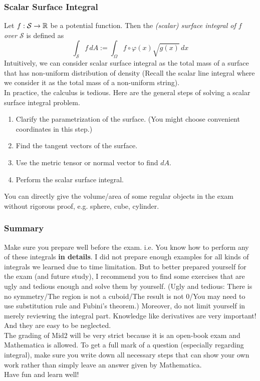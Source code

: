 \documentclass[10pt, t]{beamer}
\renewcommand{\emph}[1]{{\color{Turquoise3}\textsl{#1}}}
\newcommand{\nullspace}{~\\[15pt]}
\begin{document}
\begin{frame}
    \frametitle{Scalar Surface Integral}
    Let $f:\mathcal{S}\to\mathbb{R}$ be a potential function. Then the \emph{(scalar) surface integral of $f$ over $\mathcal{S}$} is defined as
    \[\int_\mathcal{S}f\,dA:=\int_\Omega f\circ\varphi(x)\sqrt{g(x)}\,dx\]
    Intuitively, we can consider scalar surface integral as the total mass of a surface that has non-uniform distribution of density (Recall the scalar line integral where we consider it as the total mass of a non-uniform string).
    \nullspace
    In practice, the calculus is tedious. Here are the general steps of solving a scalar surface integral problem.
    \begin{enumerate}
        \item Clarify the parametrization of the surface. (You might choose convenient coordinates in this step.)
        \item Find the tangent vectors of the surface.
        \item Use the metric tensor or normal vector to find $dA$.
        \item Perform the scalar surface integral.
    \end{enumerate}
    You can directly give the volume/area of some regular objects in the exam without rigorous proof, e.g. sphere, cube, cylinder.

\end{frame}

\begin{frame}
    \frametitle{Summary}
    Make sure you prepare well before the exam. i.e. You know how to perform any of these integrals \textbf{in details}. I did not prepare enough examples for all kinds of integrals we learned due to time limitation. But to better prepared yourself for the exam (and future study), I recommend you to find some exercises that are ugly and tedious enough and solve them by yourself. (Ugly and tedious: There is no symmetry/The region is not a cuboid/The result is not 0/You may need to use substitution rule and Fubini's theorem.) Moreover, do not limit yourself in merely reviewing the integral part. Knowledge like derivatives are very important! And they are easy to be neglected.
    \nullspace
    The grading of Mid2 will be very strict because it is an open-book exam and Mathematica is allowed. To get a full mark of a question (especially regarding integral), make sure you write down all necessary steps that can show your own work rather than simply leave an answer given by Mathematica.
    \nullspace
    Have fun and learn well!
\end{frame}
\end{document}
